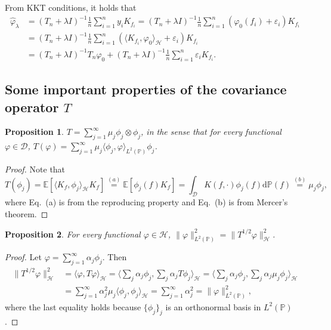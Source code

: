 \documentclass[11pt,a4paper]{article}
\renewcommand{\hat}{\widehat}
\theoremstyle{definition}
\theoremstyle{plain}
\newtheorem{proposition}{Proposition}[section]
\theoremstyle{remark}
\newcommand{\mD}{\mathcal D}
\newcommand{\bP}{\mathbb P}
\newcommand{\lp}{L^2(\bP)}
\newcommand{\ud}{\mathrm d}
\newcommand{\mH}{\mathcal H}
\begin{document}
From KKT conditions, it holds that
\begin{align*}
\hat\varphi_\lambda 
&= (T_n+\lambda I)^{-1} \frac{1}{n}\sum_{i=1}^n y_i K_{f_i} =  (T_n+\lambda I)^{-1} \frac{1}{n}\sum_{i=1}^n (\varphi_0(f_i)+\varepsilon_i) K_{f_i}\\
&=  (T_n+\lambda I)^{-1} \frac{1}{n}\sum_{i=1}^n (\langle K_{f_i},\varphi_0\rangle_{\mH}+\varepsilon_i) K_{f_i}\\
&= (T_n+\lambda I)^{-1} T_n \varphi_0 + (T_n+\lambda I)^{-1} \frac{1}{n}\sum_{i=1}^n\varepsilon_i K_{f_i}.
\end{align*}

\subsection{Some important properties of the covariance operator $T$}

\begin{proposition} 
$T=\sum_{j=1}^{\infty} \mu_j\phi_j\otimes\phi_j$, in the sense that for every functional $\varphi\in\mD$, $T(\varphi)=\sum_{j=1}^{\infty}\mu_j\langle\phi_j,\varphi\rangle_{\lp}\phi_j$.
\end{proposition}
\begin{proof}
Note that
$$
T(\phi_j) = \mathbb E[\langle K_f,\phi_j\rangle_{\mH} K_f] \overset{(a)}{=} \mathbb E[\phi_j(f)K_f] = \int_{\mD} K(f,\cdot)\phi_j(f)\ud\bP(f) \overset{(b)}{=} \mu_j\phi_j,
$$
where Eq.~(a) is from the reproducing property and Eq.~(b) is from Mercer's theorem. 
\end{proof}

\begin{proposition}
\label{prop:lp-lh}
For every functional $\varphi\in\mH$, $\|\varphi\|_{\lp}^2 = \|T^{1/2}\varphi\|_{\mH}^2$.
\end{proposition}
\begin{proof}
Let $\varphi=\sum_{j=1}^{\infty}\alpha_j\phi_j$. Then
\begin{align*}
\|T^{1/2}\varphi\|_{\mH}^2 &= \textstyle\langle\varphi, T\varphi\rangle_{\mH} = \langle\sum_j\alpha_j\phi_j, \sum_j \alpha_j T\phi_j\rangle_{\mH}  = \langle\sum_j \alpha_j\phi_j, \sum_j \alpha_j\mu_j\phi_j\rangle_{\mH}\\
&= \sum_{j=1}^{\infty} \alpha_j^2 \mu_j\langle\phi_j,\phi_j\rangle_{\mH} = \sum_{j=1}^{\infty}\alpha_j^2 = \|\varphi\|_{\lp}^2,
\end{align*}
where the last equality holds because $\{\phi_j\}_j$ is an orthonormal basis in $\lp$.
\end{proof}
\end{document}
